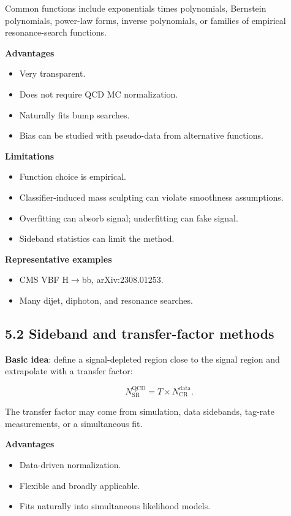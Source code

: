 \documentclass[11pt]{article}
\begin{document}
Common functions include exponentials times polynomials, Bernstein polynomials, power-law forms, inverse polynomials, or families of empirical resonance-search functions.

\textbf{Advantages}

\begin{itemize}
\item Very transparent.
\item Does not require QCD MC normalization.
\item Naturally fits bump searches.
\item Bias can be studied with pseudo-data from alternative functions.
\end{itemize}

\textbf{Limitations}

\begin{itemize}
\item Function choice is empirical.
\item Classifier-induced mass sculpting can violate smoothness assumptions.
\item Overfitting can absorb signal; underfitting can fake signal.
\item Sideband statistics can limit the method.
\end{itemize}

\textbf{Representative examples}

\begin{itemize}
\item CMS VBF H$\to$bb, arXiv:2308.01253.
\item Many dijet, diphoton, and resonance searches.
\end{itemize}

\subsection{5.2 Sideband and transfer-factor methods}

\textbf{Basic idea}: define a signal-depleted region close to the signal region and extrapolate with a transfer factor:

\[
N_{\mathrm{SR}}^{\mathrm{QCD}} = T \times N_{\mathrm{CR}}^{\mathrm{data}}.
\]

The transfer factor may come from simulation, data sidebands, tag-rate measurements, or a simultaneous fit.

\textbf{Advantages}

\begin{itemize}
\item Data-driven normalization.
\item Flexible and broadly applicable.
\item Fits naturally into simultaneous likelihood models.
\end{itemize}
\end{document}
